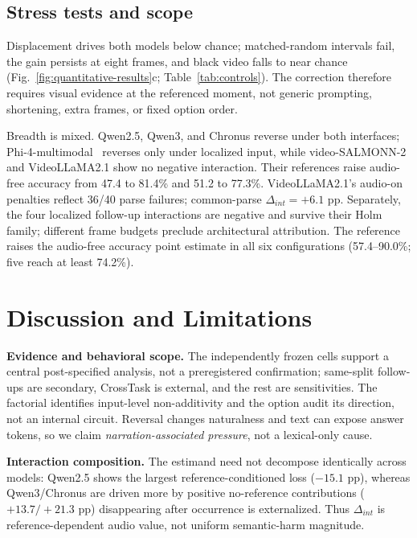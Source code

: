 \subsection{Stress tests and scope}

Displacement drives both models below chance; matched-random intervals fail, the gain persists at eight frames, and black video falls to near chance (Fig.~\ref{fig:quantitative-results}c; Table~\ref{tab:controls}). The correction therefore requires visual evidence at the referenced moment, not generic prompting, shortening, extra frames, or fixed option order.

Breadth is mixed. Qwen2.5, Qwen3, and Chronus reverse under both interfaces; Phi-4-multimodal~\cite{microsoft2025phi4mini} reverses only under localized input, while video-SALMONN-2 and VideoLLaMA2.1 show no negative interaction. Their references raise audio-free accuracy from 47.4 to 81.4\% and 51.2 to 77.3\%. VideoLLaMA2.1's audio-on penalties reflect 36/40 parse failures; common-parse $\Delta_{int}=+6.1$ pp. Separately, the four localized follow-up interactions are negative and survive their Holm family; different frame budgets preclude architectural attribution. The reference raises the audio-free accuracy point estimate in all six configurations (57.4--90.0\%; five reach at least 74.2\%).

\section{Discussion and Limitations}
\label{sec:discussion}

\textbf{Evidence and behavioral scope.} The independently frozen cells support a central post-specified analysis, not a preregistered confirmation; same-split follow-ups are secondary, CrossTask is external, and the rest are sensitivities. The factorial identifies input-level non-additivity and the option audit its direction, not an internal circuit. Reversal changes naturalness and text can expose answer tokens, so we claim \emph{narration-associated pressure}, not a lexical-only cause.

\textbf{Interaction composition.} The estimand need not decompose identically across models: Qwen2.5 shows the largest reference-conditioned loss ($-15.1$ pp), whereas Qwen3/Chronus are driven more by positive no-reference contributions ($+13.7/+21.3$ pp) disappearing after occurrence is externalized. Thus $\Delta_{int}$ is reference-dependent audio value, not uniform semantic-harm magnitude.

